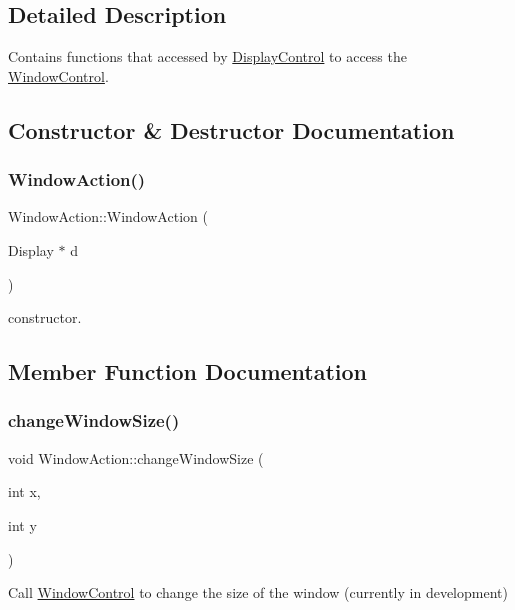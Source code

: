 \subsection{Detailed Description}
Contains functions that accessed by \hyperlink{classDisplayControl}{Display\+Control} to access the \hyperlink{classWindowControl}{Window\+Control}. 

\subsection{Constructor \& Destructor Documentation}
\mbox{\label{classWindowAction_a1836cf300ad545fa88f33454d09765e1}} 
\subsubsection{\texorpdfstring{Window\+Action()}{WindowAction()}}
{\footnotesize\ttfamily Window\+Action\+::\+Window\+Action (\begin{DoxyParamCaption}\item[{Display $\ast$}]{d }\end{DoxyParamCaption})}

constructor. 

\subsection{Member Function Documentation}
\mbox{\label{classWindowAction_ac7145d79c3b902a716d554d09e6e2a63}} 
\subsubsection{\texorpdfstring{change\+Window\+Size()}{changeWindowSize()}}
{\footnotesize\ttfamily void Window\+Action\+::change\+Window\+Size (\begin{DoxyParamCaption}\item[{int}]{x,  }\item[{int}]{y }\end{DoxyParamCaption})}

Call \hyperlink{classWindowControl}{Window\+Control} to change the size of the window (currently in development)


